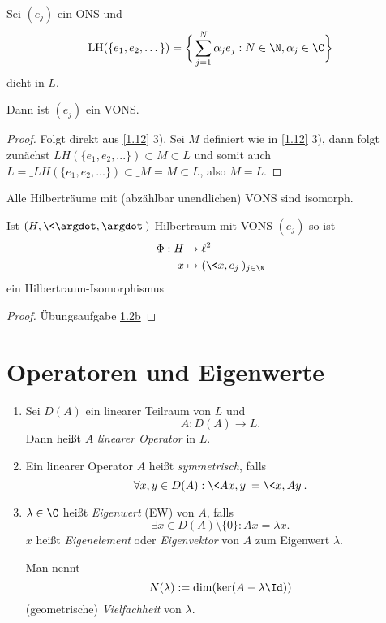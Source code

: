 \begin{nt} \label{1.15}
	Sei $(e_j)$ ein ONS und
	\[
		\LH(\{e_1,e_2,\dotsc\}) = \bigg\{ \sum_{j=1}^N \alpha_j e_j : N \in \N, \alpha_j \in \C \bigg\}
	\]
	dicht in $L$.

	Dann ist $(e_j)$ ein VONS.
	\begin{proof}
		Folgt direkt aus \ref{1.12} 3). Sei $ M $ definiert wie in \ref{1.12} 3), dann folgt zunächst $ LH(\{e_1,e_2,...\})\subset M \subset L $ und somit auch $ L=\_{LH(\{e_1,e_2,...\})}\subset \_ M=M\subset L $, also $ M=L $.
	\end{proof}
\end{nt}

\begin{st} \label{1.16}
	Alle Hilberträume mit (abzählbar unendlichen) VONS sind isomorph. 

	Ist $(H,\<\argdot, \argdot\>)$ Hilbertraum mit VONS $(e_j)$ so ist
	\begin{align*}
		\Phi: H &\to \ell^2 \\
		x &\mapsto (\<x,e_j\>)_{j\in \N}
	\end{align*}
	ein Hilbertraum-Isomorphismus
	\begin{proof}
		Übungsaufgabe \href{http://www.iadm.uni-stuttgart.de/LstAnaMPhy/Lesky/Vorlesungen/13-Hoehere-Analysis/blatt01.pdf}{1.2b}
	\end{proof}
\end{st}



\section{Operatoren und Eigenwerte}



\begin{df} \label{1.17}
	\begin{enumerate}[1)]
		\item
			Sei $D(A)$ ein linearer Teilraum von $L$ und
			\[
				A : D(A) \to L.
			\]
			Dann heißt $A$ \emph{linearer Operator} in $L$.
		\item
			Ein linearer Operator $A$ heißt \emph{symmetrisch}, falls
			\[
				\forall x,y \in D(A) : \<Ax,y\> = \<x,Ay\>.
			\]
		\item
			$\lambda \in \C$ heißt \emph{Eigenwert} (EW) von $A$, falls
			\[
				\exists x \in D(A) \setminus \{0\} : Ax = \lambda x.
			\]
			$x$ heißt \emph{Eigenelement} oder \emph{Eigenvektor} von $A$ zum Eigenwert $\lambda$.

			Man nennt
			\[
				N(\lambda) := \dim (\ker(A-\lambda \Id))
			\]
			(geometrische) \emph{Vielfachheit} von $\lambda$.
	\end{enumerate}
\end{df}

